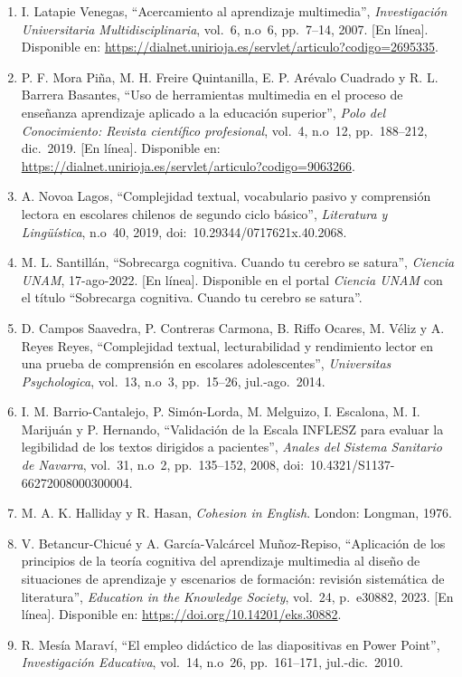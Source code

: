 \documentclass[11pt]{article}
\begin{document}
\begin{enumerate}
    \item I. Latapie Venegas, ``Acercamiento al aprendizaje multimedia'', \textit{Investigación Universitaria Multidisciplinaria}, vol.~6, n.o~6, pp.~7--14, 2007. [En línea]. Disponible en: \url{https://dialnet.unirioja.es/servlet/articulo?codigo=2695335}.
    \item P. F. Mora Piña, M. H. Freire Quintanilla, E. P. Arévalo Cuadrado y R. L. Barrera Basantes, ``Uso de herramientas multimedia en el proceso de enseñanza aprendizaje aplicado a la educación superior'', \textit{Polo del Conocimiento: Revista científico profesional}, vol.~4, n.o~12, pp.~188--212, dic.~2019. [En línea]. Disponible en: \url{https://dialnet.unirioja.es/servlet/articulo?codigo=9063266}.
    \item A. Novoa Lagos, ``Complejidad textual, vocabulario pasivo y comprensión lectora en escolares chilenos de segundo ciclo básico'', \textit{Literatura y Lingüística}, n.o~40, 2019, doi:~10.29344/0717621x.40.2068.
    \item M. L. Santillán, ``Sobrecarga cognitiva. Cuando tu cerebro se satura'', \textit{Ciencia UNAM}, 17-ago-2022. [En línea]. Disponible en el portal \textit{Ciencia UNAM} con el título ``Sobrecarga cognitiva. Cuando tu cerebro se satura''.
    \item D. Campos Saavedra, P. Contreras Carmona, B. Riffo Ocares, M. Véliz y A. Reyes Reyes, ``Complejidad textual, lecturabilidad y rendimiento lector en una prueba de comprensión en escolares adolescentes'', \textit{Universitas Psychologica}, vol.~13, n.o~3, pp.~15--26, jul.-ago.~2014.
    \item I. M. Barrio-Cantalejo, P. Simón-Lorda, M. Melguizo, I. Escalona, M. I. Marijuán y P. Hernando, ``Validación de la Escala INFLESZ para evaluar la legibilidad de los textos dirigidos a pacientes'', \textit{Anales del Sistema Sanitario de Navarra}, vol.~31, n.o~2, pp.~135--152, 2008, doi:~10.4321/S1137-66272008000300004.
    \item M. A. K. Halliday y R. Hasan, \textit{Cohesion in English}. London: Longman, 1976.
    \item V. Betancur-Chicué y A. García-Valcárcel Muñoz-Repiso, ``Aplicación de los principios de la teoría cognitiva del aprendizaje multimedia al diseño de situaciones de aprendizaje y escenarios de formación: revisión sistemática de literatura'', \textit{Education in the Knowledge Society}, vol.~24, p.~e30882, 2023. [En línea]. Disponible en: \url{https://doi.org/10.14201/eks.30882}.
    \item R. Mesía Maraví, ``El empleo didáctico de las diapositivas en Power Point'', \textit{Investigación Educativa}, vol.~14, n.o~26, pp.~161--171, jul.-dic.~2010.

\end{enumerate}
\end{document}
